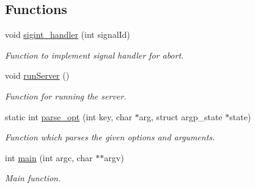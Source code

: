 \subsection*{Functions}
\begin{DoxyCompactItemize}
\item 
void \hyperlink{simple-iec61850-server_8c_aa0bd1ed4ed81822b72a2b4fb9acba63f}{sigint\+\_\+handler} (int signal\+Id)\hypertarget{simple-iec61850-server_8c_aa0bd1ed4ed81822b72a2b4fb9acba63f}{}\label{simple-iec61850-server_8c_aa0bd1ed4ed81822b72a2b4fb9acba63f}

\begin{DoxyCompactList}\small\item\em Function to implement signal handler for abort. \end{DoxyCompactList}\item 
void \hyperlink{simple-iec61850-server_8c_ab704e21febb6ba6f62fd7182fabea02b}{run\+Server} ()\hypertarget{simple-iec61850-server_8c_ab704e21febb6ba6f62fd7182fabea02b}{}\label{simple-iec61850-server_8c_ab704e21febb6ba6f62fd7182fabea02b}

\begin{DoxyCompactList}\small\item\em Function for running the server. \end{DoxyCompactList}\item 
static int \hyperlink{simple-iec61850-server_8c_aaf7bc24f3891f0c63a6043f4dc2ab311}{parse\+\_\+opt} (int key, char $\ast$arg, struct argp\+\_\+state $\ast$state)
\begin{DoxyCompactList}\small\item\em Function which parses the given options and arguments. \end{DoxyCompactList}\item 
int \hyperlink{simple-iec61850-server_8c_a3c04138a5bfe5d72780bb7e82a18e627}{main} (int argc, char $\ast$$\ast$argv)
\begin{DoxyCompactList}\small\item\em Main function. \end{DoxyCompactList}\end{DoxyCompactItemize}
